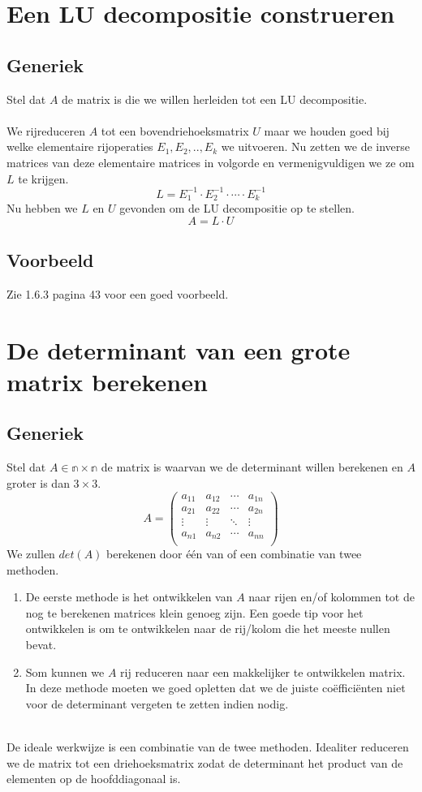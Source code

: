 \documentclass[lineaire_algebra_oplossingen.tex]{subfiles}
\begin{document}
\section{Een LU decompositie construeren}
\subsection*{Generiek}
Stel dat $A$ de matrix is die we willen herleiden tot een LU decompositie.\\\\
We rijreduceren $A$ tot een bovendriehoeksmatrix $U$ maar we houden goed bij welke elementaire rijoperaties $E_1,E_2,..,E_k$ we uitvoeren. Nu zetten we de inverse matrices van deze elementaire matrices in volgorde en vermenigvuldigen we ze om $L$ te krijgen.
\[
L = E_1^{-1} \cdot E_2^{-1} \cdot \cdots \cdot  E_k^{-1}
\] 
Nu hebben we $L$ en $U$ gevonden om de LU decompositie op te stellen.
\[
A = L\cdot U
\]
\subsection*{Voorbeeld}
Zie 1.6.3 pagina 43 voor een goed voorbeeld.

\section{De determinant van een grote matrix berekenen}
\subsection*{Generiek}
Stel dat $A \in \mathbb{n\times n}$ de matrix is waarvan we de determinant willen berekenen en $A$ groter is dan $3\times 3$.
\[
A = 
\begin{pmatrix}
a_{11} & a_{12} & \cdots & a_{1n}\\
a_{21} & a_{22} & \cdots & a_{2n}\\
\vdots & \vdots & \ddots & \vdots\\
a_{n1} & a_{n2} & \cdots & a_{nn}\\
\end{pmatrix}
\]
We zullen $det(A)$ berekenen door \'e\'en van of een combinatie van twee methoden.
\begin{enumerate}
\item De eerste methode is het ontwikkelen van $A$ naar rijen en/of kolommen tot de nog te berekenen matrices klein genoeg zijn. Een goede tip voor het ontwikkelen is om te ontwikkelen naar de rij/kolom die het meeste nullen bevat.

\item Som kunnen we $A$ rij reduceren naar een makkelijker te ontwikkelen matrix.
In deze methode moeten we goed opletten dat we de juiste co\"effici\"enten niet voor de determinant vergeten te zetten indien nodig.\\\\
\end{enumerate}
De ideale werkwijze is een combinatie van de twee methoden.
Idealiter reduceren we de matrix tot een driehoeksmatrix zodat de determinant het product van de elementen op de hoofddiagonaal is.
\end{document}
